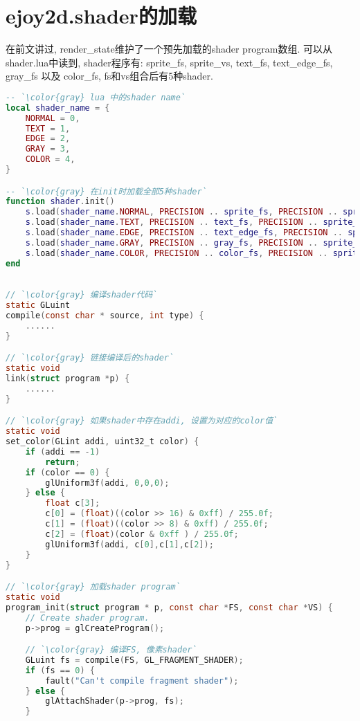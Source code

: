 \section {\ZHH ejoy2d.shader的加载} {

    {在前文讲过, render\_state维护了一个预先加载的shader program数组. 可以从shader.lua中读到, shader程序有: sprite\_fs, sprite\_vs, text\_fs, text\_edge\_fs, gray\_fs 以及 color\_fs, fs和vs组合后有5种shader. }\par

\begin{lstlisting}[language=lua]
-- `\color{gray} lua 中的shader name`
local shader_name = {
    NORMAL = 0,
    TEXT = 1,
    EDGE = 2,
    GRAY = 3,
    COLOR = 4,
}

-- `\color{gray} 在init时加载全部5种shader`
function shader.init()
    s.load(shader_name.NORMAL, PRECISION .. sprite_fs, PRECISION .. sprite_vs)
    s.load(shader_name.TEXT, PRECISION .. text_fs, PRECISION .. sprite_vs)
    s.load(shader_name.EDGE, PRECISION .. text_edge_fs, PRECISION .. sprite_vs)
    s.load(shader_name.GRAY, PRECISION .. gray_fs, PRECISION .. sprite_vs)
    s.load(shader_name.COLOR, PRECISION .. color_fs, PRECISION .. sprite_vs)
end
\end{lstlisting}

\begin{lstlisting}[language=C]

// `\color{gray} 编译shader代码`
static GLuint
compile(const char * source, int type) {
    ......
}

// `\color{gray} 链接编译后的shader`
static void
link(struct program *p) {
    ......
}

// `\color{gray} 如果shader中存在addi, 设置为对应的color值`
static void
set_color(GLint addi, uint32_t color) {
    if (addi == -1)
        return;
    if (color == 0) {
        glUniform3f(addi, 0,0,0);
    } else {
        float c[3];
        c[0] = (float)((color >> 16) & 0xff) / 255.0f;
        c[1] = (float)((color >> 8) & 0xff) / 255.0f;
        c[2] = (float)(color & 0xff ) / 255.0f;
        glUniform3f(addi, c[0],c[1],c[2]);
    }
}

// `\color{gray} 加载shader program`
static void
program_init(struct program * p, const char *FS, const char *VS) {
    // Create shader program.
    p->prog = glCreateProgram();

    // `\color{gray} 编译FS, 像素shader`
    GLuint fs = compile(FS, GL_FRAGMENT_SHADER);
    if (fs == 0) {
        fault("Can't compile fragment shader");
    } else {
        glAttachShader(p->prog, fs);
    }


\end{lstlisting}}
